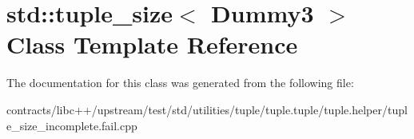 \hypertarget{classstd_1_1tuple__size_3_01_dummy3_01_4}{}\section{std\+:\+:tuple\+\_\+size$<$ Dummy3 $>$ Class Template Reference}
\label{classstd_1_1tuple__size_3_01_dummy3_01_4}


The documentation for this class was generated from the following file\+:\begin{DoxyCompactItemize}
\item 
contracts/libc++/upstream/test/std/utilities/tuple/tuple.\+tuple/tuple.\+helper/tuple\+\_\+size\+\_\+incomplete.\+fail.\+cpp\end{DoxyCompactItemize}
